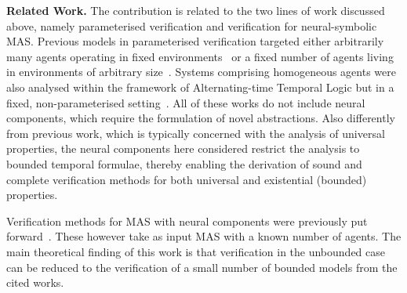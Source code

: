 {\bf Related Work.}  The contribution is related to the two
lines of work discussed above, namely parameterised
verification and verification for neural-symbolic MAS.
Previous models in parameterised verification targeted
either arbitrarily many agents operating in fixed
environments~\cite{KouvarosLomuscio16a,FelliGianolaMontali20}
or a fixed number of agents living in environments of
arbitrary size~\cite{AminofMuranoRubin16}. Systems
comprising  homogeneous agents were also analysed within the
framework of Alternating-time Temporal Logic but in a fixed,
non-parameterised setting~\cite{PedersenDyrkolbotn13}. All
of these works do not include neural components, which
require the formulation of novel abstractions. Also
differently from previous work, which is typically concerned
with the analysis of universal properties, the neural
components here considered restrict the analysis to bounded
temporal formulae, thereby enabling the derivation of sound
and complete verification methods for both universal and
existential (bounded) properties.

Verification methods for MAS with neural components were
previously put forward~\cite{Akintunde+20b,Akintunde+22}.
These however take as input MAS with a known number of
agents. The main theoretical finding of this work is that
verification in the unbounded case can be reduced to the
verification of a small number of bounded models from the
cited works.





